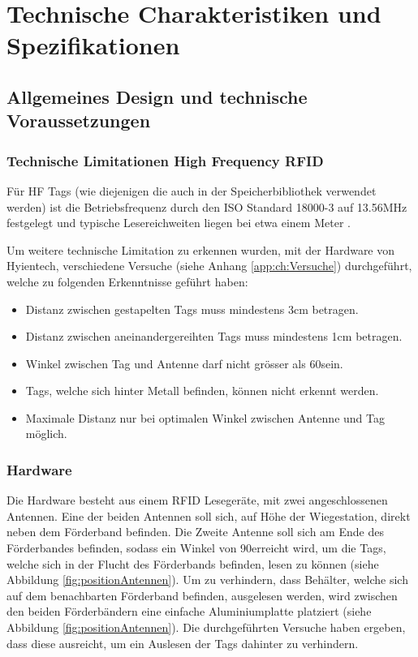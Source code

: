 \chapter{Technische Charakteristiken und Spezifikationen}

\section{Allgemeines Design und technische Voraussetzungen}

\subsection{Technische Limitationen High Frequency RFID}
Für HF Tags (wie diejenigen die auch in der Speicherbibliothek verwendet werden) ist die Betriebsfrequenz durch den ISO Standard 18000-3 auf 13.56MHz festgelegt und typische Lesereichweiten liegen bei etwa einem Meter \parencite{chawla2007}.

Um weitere technische Limitation zu erkennen wurden, mit der Hardware von Hyientech, verschiedene Versuche (siehe Anhang \ref{app:ch:Versuche}) durchgeführt, welche zu folgenden Erkenntnisse geführt haben:

\begin{itemize}
	\item Distanz zwischen gestapelten Tags muss mindestens 3cm betragen.
	\item Distanz zwischen aneinandergereihten Tags muss mindestens 1cm betragen.
	\item Winkel zwischen Tag und Antenne darf nicht grösser als 60\SIUnitSymbolDegree sein.
	\item Tags, welche sich hinter Metall befinden, können nicht erkennt werden.
	\item Maximale Distanz nur bei optimalen Winkel zwischen Antenne und Tag möglich.
\end{itemize}

\subsection{Hardware}
Die Hardware besteht aus einem RFID Lesegeräte, mit zwei angeschlossenen Antennen. Eine der beiden Antennen soll sich, auf Höhe der Wiegestation, direkt neben dem Förderband befinden. Die Zweite Antenne soll sich am Ende des Förderbandes befinden, sodass ein Winkel von 90\SIUnitSymbolDegree erreicht wird, um die Tags, welche sich in der Flucht des Förderbands befinden, lesen zu können (siehe Abbildung \ref{fig:positionAntennen}). Um zu verhindern, dass Behälter, welche sich auf dem benachbarten Förderband befinden, ausgelesen werden, wird zwischen den beiden Förderbändern eine einfache Aluminiumplatte platziert (siehe Abbildung \ref{fig:positionAntennen}). Die durchgeführten Versuche haben ergeben, dass diese ausreicht, um ein Auslesen der Tags dahinter zu verhindern.

